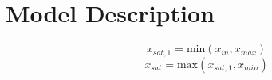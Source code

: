 \section{Model Description}
\begin{equation}
	x_{sat,1} = \textrm{min}(x_{in}, x_{max})
	\end{equation}
	\begin{equation}
	x_{sat}= \textrm{max}(x_{sat,1}, x_{min})
	\end{equation}
